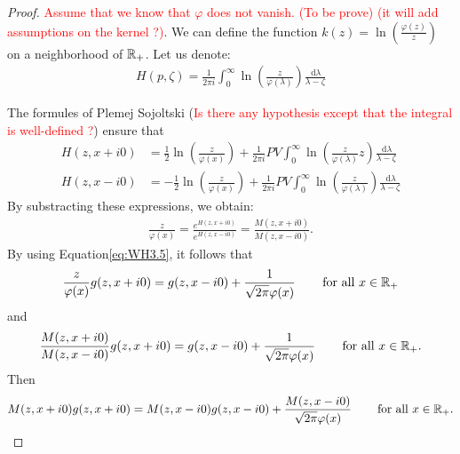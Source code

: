 \documentclass[11pt]{amsart}
\newcommand{\diff}{\,\mathrm{d}}
\begin{document}
\begin{proof}
\textcolor{red}{Assume that we know that $\varphi$ does not vanish. (To be prove) (it will add assumptions on the kernel ?)}. We can define the function $k(z) = \ln\left(\frac{\varphi(z)}{z}\right)$ on a neighborhood of $\mathbb{R}_+$.
Let us denote:
    \begin{align*}
        H(p,\zeta) = \frac{1}{2\pi i }\int_0^\infty \ln\left(\frac{z}{\varphi(\lambda)}\right) \frac{\diff \lambda}{\lambda - \zeta}
    \end{align*}

The formules of Plemej Sojoltski (\textcolor{red}{Is there any hypothesis except that the integral is well-defined ?}) ensure that 
    \begin{align*}
        H(z,x+i0) &= \frac{1}{2} \ln\left(\frac{z}{\varphi(x)}\right) + \frac{1}{2\pi i} PV\int_0^\infty \ln\left(\frac{z}{\varphi(\lambda)}{z}\right) \frac{\diff \lambda}{\lambda - \zeta} \\
        H(z,x-i0) &= -\frac{1}{2} \ln\left(\frac{z}{\varphi(x)}\right) + \frac{1}{2\pi i} PV\int_0^\infty \ln\left(\frac{z}{\varphi(\lambda)}\right) \frac{\diff \lambda}{\lambda - \zeta}
    \end{align*}
By substracting these expressions, we obtain:
\begin{align*}
    \frac{z}{\varphi(x)}
    = \frac{e^{H(z,x+i0)}}{e^{H(z,x-i0)}} 
    = \frac{M(z,x+i0)}{M(z,x-i0)}.
\end{align*}
By using Equation\eqref{eq:WH3.5}, it follows that 
\begin{align*}
    \frac{z}{\varphi(x)} g(z, x+i0) = g(z, x-i0) + \frac{1}{\sqrt{2\pi}  \varphi(x)} \, \qquad \text{for all $x\in\mathbb{R}_+$}
\end{align*}
and 
\begin{align*}
    \frac{M(z,x+i0)}{M(z,x-i0)} g(z, x+i0) = g(z, x-i0) + \frac{1}{\sqrt{2\pi}  \varphi(x)} \, \qquad \text{for all $x\in\mathbb{R}_+$}.
\end{align*}
Then 
\begin{align*}
    M(z,x+i0)g(z, x+i0) = M(z,x-i0)g(z, x-i0) + \frac{M(z,x-i0)}{\sqrt{2\pi}  \varphi(x)} \, \qquad \text{for all $x\in\mathbb{R}_+$}.
\end{align*}


\end{proof}
\end{document}
